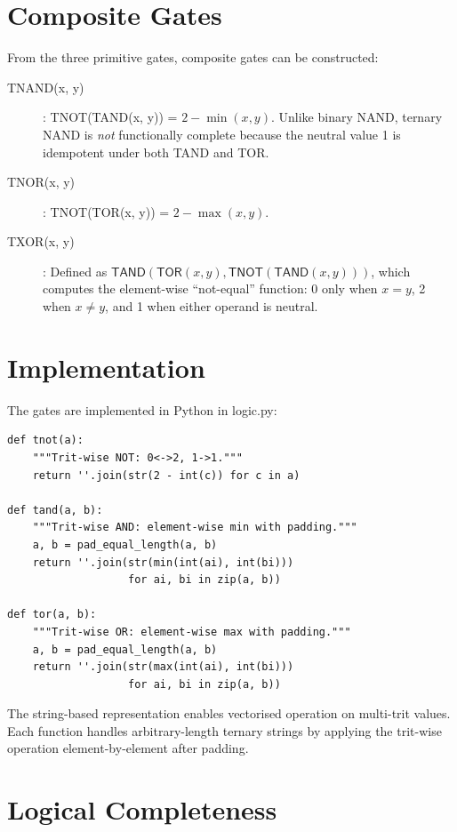 \documentclass[12pt,a4paper,twoside]{book}
\theoremstyle{trinarytheorem}
\theoremstyle{trinarydefinition}
\newcommand{\code}[1]{\textsf{#1}}
\begin{document}
\section{Composite Gates}

From the three primitive gates, composite gates can be constructed:

\begin{description}
    \item[\code{TNAND}(x, y)]: \code{TNOT(TAND(x, y))} = $2 - \min(x, y)$.
          Unlike binary NAND, ternary NAND is \emph{not} functionally complete
          because the neutral value 1 is idempotent under both TAND and TOR.
    \item[\code{TNOR}(x, y)]: \code{TNOT(TOR(x, y))} = $2 - \max(x, y)$.
    \item[\code{TXOR}(x, y)]: Defined as $\code{TAND}(\code{TOR}(x,y),
          \code{TNOT}(\code{TAND}(x,y)))$, which computes the element-wise
          ``not-equal'' function: 0 only when $x = y$, 2 when $x \neq y$,
          and 1 when either operand is neutral.
\end{description}

\section{Implementation}

The gates are implemented in Python in \code{logic.py}:

\begin{lstlisting}
def tnot(a):
    """Trit-wise NOT: 0<->2, 1->1."""
    return ''.join(str(2 - int(c)) for c in a)

def tand(a, b):
    """Trit-wise AND: element-wise min with padding."""
    a, b = pad_equal_length(a, b)
    return ''.join(str(min(int(ai), int(bi)))
                   for ai, bi in zip(a, b))

def tor(a, b):
    """Trit-wise OR: element-wise max with padding."""
    a, b = pad_equal_length(a, b)
    return ''.join(str(max(int(ai), int(bi)))
                   for ai, bi in zip(a, b))
\end{lstlisting}

The string-based representation enables vectorised operation on multi-trit
values. Each function handles arbitrary-length ternary strings by applying
the trit-wise operation element-by-element after padding.

\section{Logical Completeness}
\end{document}
